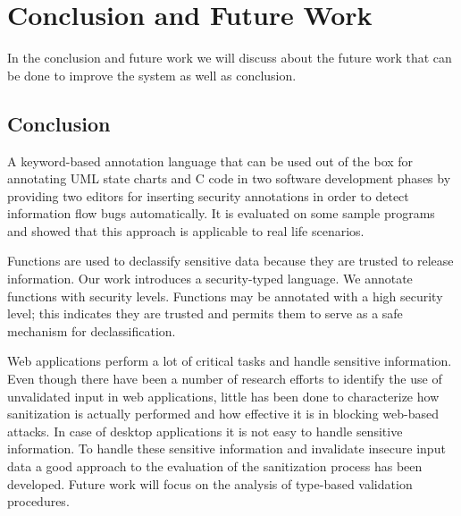 \chapter{Conclusion and Future Work}

In the conclusion and future work we will discuss about the future work that can
be done to improve the system as well as conclusion.

\section{Conclusion}
A keyword-based annotation language that can be used out of the box for annotating UML state charts and C code in two software development phases by providing two editors for inserting security annotations in order to detect information flow bugs automatically. It is evaluated on some sample programs and showed that this approach is applicable to real life scenarios.

Functions are used to declassify sensitive data because they are trusted to release information. Our work introduces a security-typed language. We annotate functions with security levels. Functions may be annotated with a high security level; this indicates they are trusted and permits them to serve as a safe mechanism for declassification.

Web applications perform a lot of critical tasks and
handle sensitive information. Even though there have been
a number of research efforts to identify the use of unvalidated input in web applications, little has been done
to characterize how sanitization is actually performed and
how effective it is in blocking web-based attacks. In case of desktop applications it is not easy to handle sensitive information. To handle these sensitive information and invalidate insecure input data a good approach to the evaluation of the sanitization process has been developed. Future work will focus on the analysis of type-based validation procedures.

